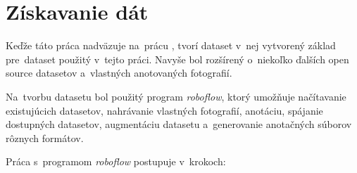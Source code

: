     \section{Získavanie dát}

        Keďže táto práca nadväzuje na~prácu \cite{Jurecka2021}, tvorí dataset v~nej vytvorený základ pre~dataset použitý v~tejto práci. Navyše bol rozšírený o~niekoľko ďalších open source datasetov a~vlastných anotovaných fotografií.

        Na~tvorbu datasetu bol použitý program \emph{roboflow}, ktorý umožňuje načítavanie existujúcich datasetov, nahrávanie vlastných fotografií, anotáciu, spájanie dostupných datasetov, augmentáciu datasetu a~generovanie anotačných súborov rôznych formátov.

        Práca s~programom \emph{roboflow} postupuje v~krokoch:

